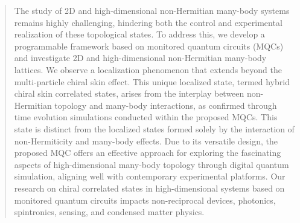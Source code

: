 \documentclass[longbibliography, aps, prx, amsmath, amssymb, amsfonts, twocolumn,superscriptaddress, footinbib]{revtex4-1}
\begin{document}
	
	
	
	\begin{abstract}

		The study of 2D and high-dimensional non-Hermitian many-body systems remains highly challenging, hindering both the control and experimental realization of these topological states.
		To address this, we develop a programmable framework based on monitored quantum circuits (MQCs) and investigate 2D and high-dimensional non-Hermitian many-body lattices.
		We observe a localization phenomenon that extends beyond the multi-particle chiral skin effect. This unique localized state, termed hybrid chiral skin correlated states, arises from the interplay between non-Hermitian topology and many-body interactions, as confirmed through time evolution simulations conducted within the proposed MQCs. This state is distinct from the localized states formed solely by the interaction of non-Hermiticity and many-body effects. Due to its versatile design, the proposed MQC offers an effective approach for exploring the fascinating aspects of high-dimensional many-body topology through digital quantum simulation, aligning well with contemporary experimental platforms.
		Our research on chiral correlated states in high-dimensional systems based on monitored quantum circuits impacts non-reciprocal devices, photonics, spintronics, sensing, and condensed matter physics. 
	\end{abstract}
	
	
	\maketitle
	
\end{document}
